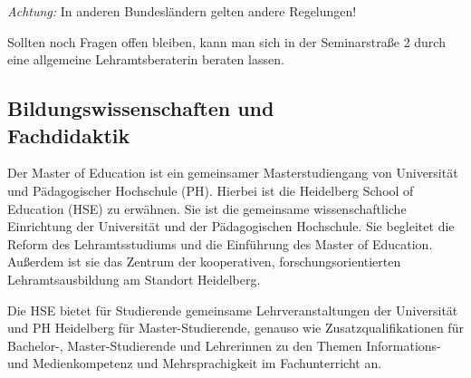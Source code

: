 \emph{Achtung:} In anderen Bundesländern gelten andere Regelungen!

Sollten noch Fragen offen bleiben, kann man sich in der Seminarstraße 2 durch eine allgemeine Lehramtsberaterin beraten lassen.


\subsection{Bildungswissenschaften und \\Fachdidaktik}
Der Master of Education ist ein gemeinsamer Masterstudiengang von Universität und Pädagogischer Hochschule (PH). Hierbei ist die Heidelberg School of  Education (HSE) zu erwähnen. Sie ist die gemeinsame wissenschaftliche Einrichtung der Universität und der Pädagogischen Hochschule. Sie begleitet die Reform des Lehramtsstudiums und die Einführung des Master of Education. Außerdem ist sie das Zentrum der kooperativen, forschungsorientierten Lehramtsausbildung am Standort Heidelberg.

Die HSE bietet für Studierende gemeinsame Lehrveranstaltungen der Universität und PH Heidelberg für Master-Studierende, genauso wie Zusatzqualifikationen für Bachelor-, Master-Studierende und Lehrerinnen zu den Themen Informations- und Medienkompetenz und Mehrsprachigkeit im Fachunterricht an.



